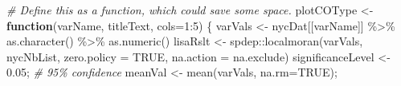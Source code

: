 \documentclass[
  11pt,
]{book}
\newenvironment{Shaded}{\begin{snugshade}}{\end{snugshade}}
\newcommand{\AttributeTok}[1]{\textcolor[rgb]{0.77,0.63,0.00}{#1}}
\newcommand{\CommentTok}[1]{\textcolor[rgb]{0.56,0.35,0.01}{\textit{#1}}}
\newcommand{\ConstantTok}[1]{\textcolor[rgb]{0.00,0.00,0.00}{#1}}
\newcommand{\ControlFlowTok}[1]{\textcolor[rgb]{0.13,0.29,0.53}{\textbf{#1}}}
\newcommand{\DecValTok}[1]{\textcolor[rgb]{0.00,0.00,0.81}{#1}}
\newcommand{\FloatTok}[1]{\textcolor[rgb]{0.00,0.00,0.81}{#1}}
\newcommand{\FunctionTok}[1]{\textcolor[rgb]{0.00,0.00,0.00}{#1}}
\newcommand{\NormalTok}[1]{#1}
\newcommand{\OtherTok}[1]{\textcolor[rgb]{0.56,0.35,0.01}{#1}}
\newcommand{\SpecialCharTok}[1]{\textcolor[rgb]{0.00,0.00,0.00}{#1}}
\begin{document}
\begin{Shaded}
\begin{Highlighting}[]
\CommentTok{\# Define this as a function, which could save some space.}
\NormalTok{plotCOType }\OtherTok{\textless{}{-}} \ControlFlowTok{function}\NormalTok{(varName, titleText, }\AttributeTok{cols=}\DecValTok{1}\SpecialCharTok{:}\DecValTok{5}\NormalTok{) \{}
\NormalTok{  varVals }\OtherTok{\textless{}{-}}\NormalTok{ nycDat[[varName]] }\SpecialCharTok{\%\textgreater{}\%} \FunctionTok{as.character}\NormalTok{() }\SpecialCharTok{\%\textgreater{}\%} \FunctionTok{as.numeric}\NormalTok{()}
\NormalTok{  lisaRslt }\OtherTok{\textless{}{-}}\NormalTok{ spdep}\SpecialCharTok{::}\FunctionTok{localmoran}\NormalTok{(varVals, nycNbList, }
                                \AttributeTok{zero.policy =} \ConstantTok{TRUE}\NormalTok{, }\AttributeTok{na.action =}\NormalTok{ na.exclude)}
\NormalTok{  significanceLevel }\OtherTok{\textless{}{-}} \FloatTok{0.05}\NormalTok{; }\CommentTok{\# 95\% confidence}
\NormalTok{  meanVal }\OtherTok{\textless{}{-}} \FunctionTok{mean}\NormalTok{(varVals, }\AttributeTok{na.rm=}\ConstantTok{TRUE}\NormalTok{);}
  

\end{Highlighting}
\end{Shaded}
\end{document}
